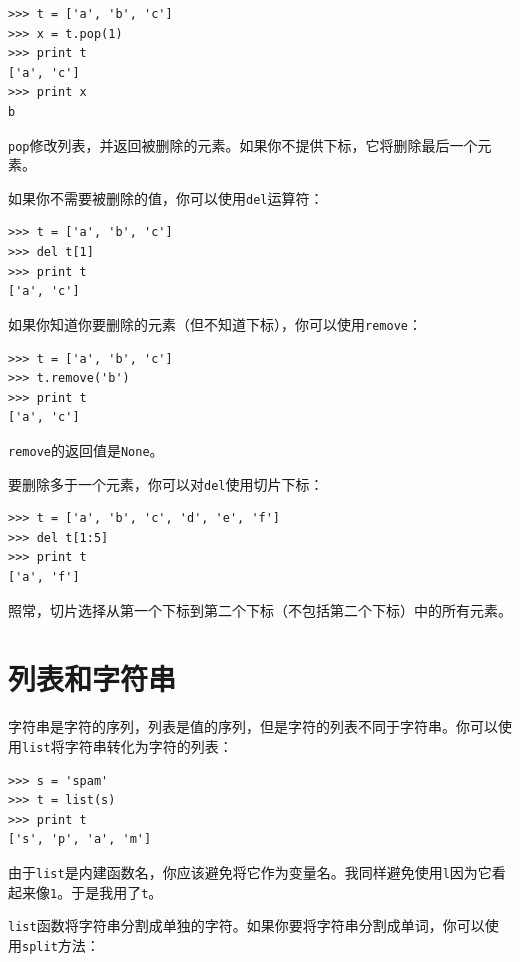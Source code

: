 \beforeverb
\begin{verbatim}
>>> t = ['a', 'b', 'c']
>>> x = t.pop(1)
>>> print t
['a', 'c']
>>> print x
b
\end{verbatim}
\afterverb
%
{\tt pop}修改列表，并返回被删除的元素。如果你不提供下标，它将删除最后一个元素。

如果你不需要被删除的值，你可以使用{\tt del}运算符：


\beforeverb
\begin{verbatim}
>>> t = ['a', 'b', 'c']
>>> del t[1]
>>> print t
['a', 'c']
\end{verbatim}
\afterverb
%
如果你知道你要删除的元素（但不知道下标），你可以使用{\tt remove}：


\beforeverb
\begin{verbatim}
>>> t = ['a', 'b', 'c']
>>> t.remove('b')
>>> print t
['a', 'c']
\end{verbatim}
\afterverb
%
{\tt remove}的返回值是{\tt None}。


要删除多于一个元素，你可以对{\tt del}使用切片下标：

\beforeverb
\begin{verbatim}
>>> t = ['a', 'b', 'c', 'd', 'e', 'f']
>>> del t[1:5]
>>> print t
['a', 'f']
\end{verbatim}
\afterverb
%
照常，切片选择从第一个下标到第二个下标（不包括第二个下标）中的所有元素。


\section{列表和字符串}


字符串是字符的序列，列表是值的序列，但是字符的列表不同于字符串。你可以使用{\tt list}将字符串转化为字符的列表：


\beforeverb
\begin{verbatim}
>>> s = 'spam'
>>> t = list(s)
>>> print t
['s', 'p', 'a', 'm']
\end{verbatim}
\afterverb
%
由于{\tt list}是内建函数名，你应该避免将它作为变量名。我同样避免使用{\tt l}因为它看起来像{\tt 1}。于是我用了{\tt t}。

{\tt list}函数将字符串分割成单独的字符。如果你要将字符串分割成单词，你可以使用{\tt split}方法：

